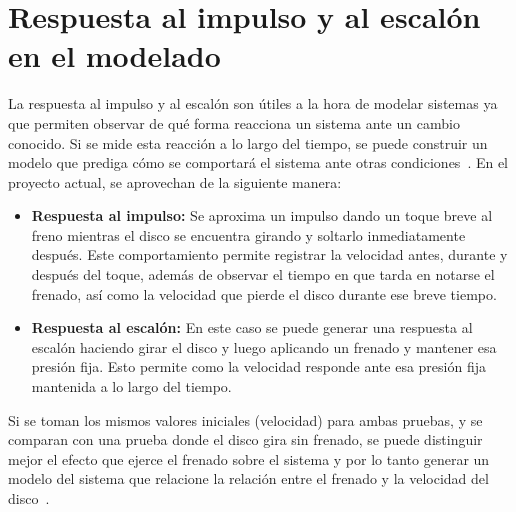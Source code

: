 \section{Respuesta al impulso y al escalón en el modelado}
\label{sec:p1}

La respuesta al impulso y al escalón son útiles a la hora de modelar sistemas ya que permiten
observar de qué forma reacciona un sistema ante un cambio conocido. Si se mide esta reacción a lo
largo del tiempo, se puede construir un modelo que prediga cómo se comportará el sistema ante
otras condiciones~\cite{ogata1996discreto,astrom2021feedback}. En el proyecto actual, se aprovechan de la siguiente manera:

\begin{itemize}
  \item \textbf{Respuesta al impulso:} Se aproxima un impulso dando un toque breve al freno
  mientras el disco se encuentra girando y soltarlo inmediatamente después. Este comportamiento
  permite registrar la velocidad antes, durante y después del toque, además de observar el tiempo
  en que tarda en notarse el frenado, así como la velocidad que pierde el disco durante ese breve
  tiempo.
  \item \textbf{Respuesta al escalón:} En este caso se puede generar una respuesta al escalón
  haciendo girar el disco y luego aplicando un frenado y mantener esa presión fija. Esto permite
  como la velocidad responde ante esa presión fija mantenida a lo largo del tiempo.
\end{itemize}

Si se toman los mismos valores iniciales (velocidad) para ambas pruebas, y se comparan con una
prueba donde el disco gira sin frenado, se puede distinguir mejor el efecto que ejerce el frenado
sobre el sistema y por lo tanto generar un modelo del sistema que relacione la relación entre el
frenado y la velocidad del disco~\cite{astrom2021feedback}.
